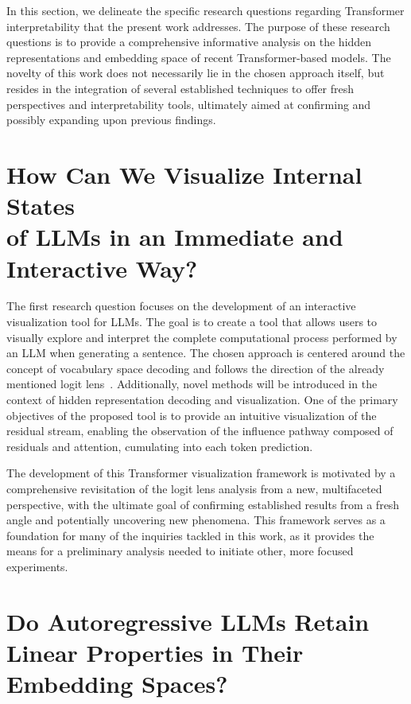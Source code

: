 In this section, we delineate the specific research questions regarding Transformer interpretability that the present work addresses.
The purpose of these research questions is to provide a comprehensive informative analysis on the hidden representations and embedding space of recent Transformer-based models.
The novelty of this work does not necessarily lie in the chosen approach itself, but resides in the integration of several established techniques to offer fresh perspectives and interpretability tools, ultimately aimed at confirming and possibly expanding upon previous findings.

\section[How Can We Visualize Internal States of LLMs in an Immediate and Interactive Way?]{How Can We Visualize Internal States \texorpdfstring{ \\ }{} of LLMs in an Immediate and \texorpdfstring{ \\ }{} Interactive Way?}\label{sec:rq_intravisto}

The first research question focuses on the development of an interactive visualization tool for LLMs.
The goal is to create a tool that allows users to visually explore and interpret the complete computational process performed by an LLM when generating a sentence.
The chosen approach is centered around the concept of vocabulary space decoding and follows the direction of the already mentioned logit lens~\cite{nostalgebraist2020}.
Additionally, novel methods will be introduced in the context of hidden representation decoding and visualization.
One of the primary objectives of the proposed tool is to provide an intuitive visualization of the residual stream, enabling the observation of the influence pathway composed of residuals and attention, cumulating into each token prediction.

The development of this Transformer visualization framework is motivated by a comprehensive revisitation of the logit lens analysis from a new, multifaceted perspective, with the ultimate goal of confirming established results from a fresh angle and potentially uncovering new phenomena.
This framework serves as a foundation for many of the inquiries tackled in this work, as it provides the means for a preliminary analysis needed to initiate other, more focused experiments.

\section{Do Autoregressive LLMs Retain Linear Properties in Their Embedding Spaces?}\label{sec:rq_embeddings}


